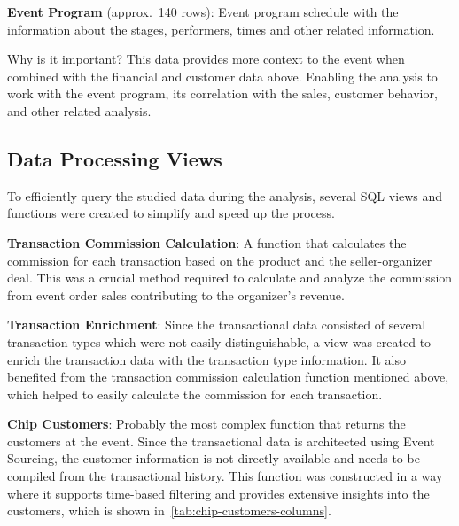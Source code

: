 \textbf{Event Program} (approx.\ 140 rows): Event program schedule with the information about the stages, performers, times and other related information.

\begin{blue-box}{Why is it important?}
	This data provides more context to the event when combined with the financial and customer data above.
	Enabling the analysis to work with the event program, its correlation with the sales, customer behavior, and other related analysis.
\end{blue-box}

\subsection{Data Processing Views}
\label{subsec:data-methodology-structure-views}
To efficiently query the studied data during the analysis, several SQL views and functions were created to simplify and speed up the process.

\textbf{Transaction Commission Calculation}: A function that calculates the commission for each transaction based on the product and the seller-organizer deal.
This was a crucial method required to calculate and analyze the commission from event order sales contributing to the organizer's revenue.

\textbf{Transaction Enrichment}: Since the transactional data consisted of several transaction types which were not easily distinguishable, a view was created to enrich the transaction data with the transaction type information.
It also benefited from the transaction commission calculation function mentioned above, which helped to easily calculate the commission for each transaction.

\textbf{Chip Customers}: Probably the most complex function that returns the customers at the event.
Since the transactional data is architected using Event Sourcing, the customer information is not directly available and needs to be compiled from the transactional history.
This function was constructed in a way where it supports time-based filtering and provides extensive insights into the customers, which is shown in~\autoref{tab:chip-customers-columns}.

